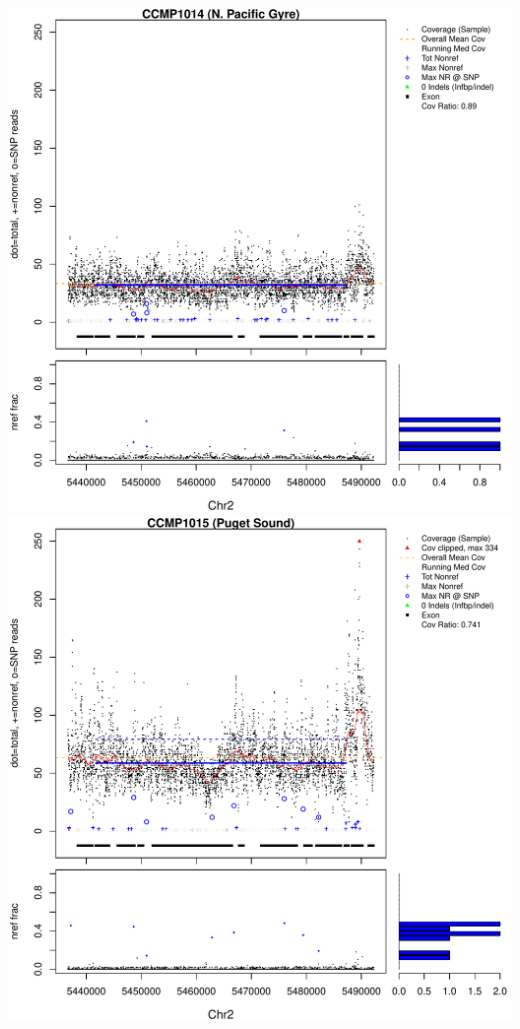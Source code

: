 \documentclass{article}\usepackage[]{graphicx}\usepackage[]{color}
\makeatletter
\def\maxwidth{ %
  \ifdim\Gin@nat@width>\linewidth
    \linewidth
  \else
    \Gin@nat@width
  \fi
}
\newenvironment{knitrout}{}{} %
\makeatother
\begin{document}
\begin{knitrout}
{\includegraphics[width=\maxwidth]{figs-knitr/unnamed-chunk-35-5} 
\includegraphics[width=\maxwidth]{figs-knitr/unnamed-chunk-35-6} 
}
\end{knitrout}
\end{document}

